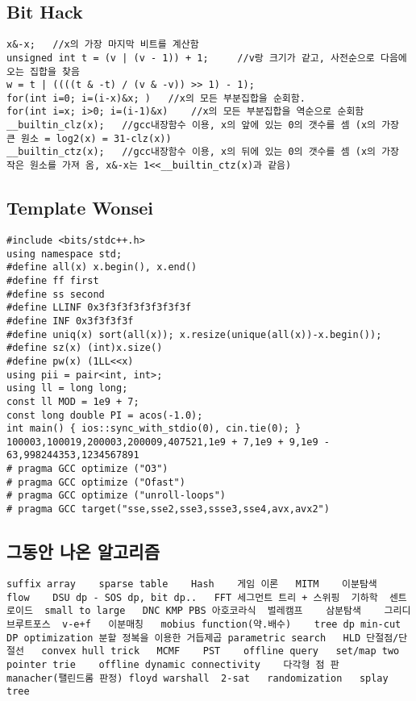 \documentclass[landscape, 8pt, a4paper, oneside, twocolumn]{extarticle}
\begin{document}
\subsection{Bit Hack}
\begin{verbatim}
x&-x;   //x의 가장 마지막 비트를 계산함
unsigned int t = (v | (v - 1)) + 1;     //v랑 크기가 같고, 사전순으로 다음에 오는 집합을 찾음
w = t | ((((t & -t) / (v & -v)) >> 1) - 1); 
for(int i=0; i=(i-x)&x; )   //x의 모든 부분집합을 순회함.
for(int i=x; i>0; i=(i-1)&x)    //x의 모든 부분집합을 역순으로 순회함
__builtin_clz(x);   //gcc내장함수 이용, x의 앞에 있는 0의 갯수를 셈 (x의 가장 큰 원소 = log2(x) = 31-clz(x))
__builtin_ctz(x);   //gcc내장함수 이용, x의 뒤에 있는 0의 갯수를 셈 (x의 가장 작은 원소를 가져 옴, x&-x는 1<<__builtin_ctz(x)과 같음)
\end{verbatim}
\subsection{Template Wonsei}
\begin{verbatim}
#include <bits/stdc++.h>
using namespace std;
#define all(x) x.begin(), x.end()
#define ff first
#define ss second
#define LLINF 0x3f3f3f3f3f3f3f3f
#define INF 0x3f3f3f3f
#define uniq(x) sort(all(x)); x.resize(unique(all(x))-x.begin());
#define sz(x) (int)x.size()
#define pw(x) (1LL<<x)
using pii = pair<int, int>;
using ll = long long;
const ll MOD = 1e9 + 7;
const long double PI = acos(-1.0);
int main() { ios::sync_with_stdio(0), cin.tie(0); }
100003,100019,200003,200009,407521,1e9 + 7,1e9 + 9,1e9 - 63,998244353,1234567891
# pragma GCC optimize ("O3")
# pragma GCC optimize ("Ofast")
# pragma GCC optimize ("unroll-loops")
# pragma GCC target("sse,sse2,sse3,ssse3,sse4,avx,avx2")
\end{verbatim}
\subsection{그동안 나온 알고리즘}
\begin{verbatim}
suffix array    sparse table    Hash    게임 이론   MITM    이분탐색    flow    DSU dp - SOS dp, bit dp..   FFT 세그먼트 트리 + 스위핑  기하학  센트로이드  small to large   DNC KMP PBS 아호코라식  벌레캠프    삼분탐색    그리디  브루트포스  v-e+f   이분매칭   mobius function(약.배수)    tree dp min-cut DP optimization 분할 정복을 이용한 거듭제곱 parametric search   HLD 단절점/단절선   convex hull trick   MCMF    PST    offline query   set/map two pointer trie    offline dynamic connectivity    다각형 점 판   manacher(팰린드롬 판정) floyd warshall  2-sat   randomization   splay tree
\end{verbatim}
\label{LastPage}
\end{document}
